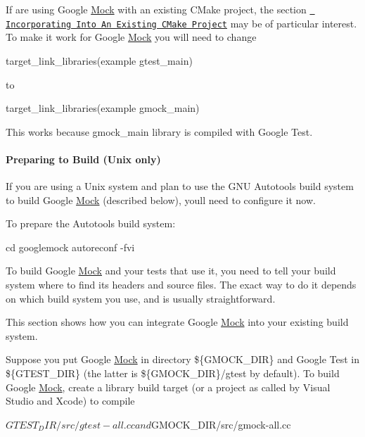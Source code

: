 If are using Google \mbox{\hyperlink{class_mock}{Mock}} with an existing C\+Make project, the section \href{../googletest/README.md\#incorporating-into-an-existing-cmake-project}{\texttt{ Incorporating Into An Existing C\+Make Project}} may be of particular interest. To make it work for Google \mbox{\hyperlink{class_mock}{Mock}} you will need to change \begin{DoxyVerb}target_link_libraries(example gtest_main)
\end{DoxyVerb}


to \begin{DoxyVerb}target_link_libraries(example gmock_main)
\end{DoxyVerb}


This works because {\ttfamily gmock\+\_\+main} library is compiled with Google Test.

\paragraph*{Preparing to Build (Unix only)}

If you are using a Unix system and plan to use the G\+NU Autotools build system to build Google \mbox{\hyperlink{class_mock}{Mock}} (described below), you\textquotesingle{}ll need to configure it now.

To prepare the Autotools build system\+: \begin{DoxyVerb}cd googlemock
autoreconf -fvi
\end{DoxyVerb}


To build Google \mbox{\hyperlink{class_mock}{Mock}} and your tests that use it, you need to tell your build system where to find its headers and source files. The exact way to do it depends on which build system you use, and is usually straightforward.

This section shows how you can integrate Google \mbox{\hyperlink{class_mock}{Mock}} into your existing build system.

Suppose you put Google \mbox{\hyperlink{class_mock}{Mock}} in directory {\ttfamily \$\{G\+M\+O\+C\+K\+\_\+\+D\+IR\}} and Google Test in {\ttfamily \$\{G\+T\+E\+S\+T\+\_\+\+D\+IR\}} (the latter is {\ttfamily \$\{G\+M\+O\+C\+K\+\_\+\+D\+IR\}/gtest} by default). To build Google \mbox{\hyperlink{class_mock}{Mock}}, create a library build target (or a project as called by Visual Studio and Xcode) to compile \begin{DoxyVerb}${GTEST_DIR}/src/gtest-all.cc and ${GMOCK_DIR}/src/gmock-all.cc
\end{DoxyVerb}


